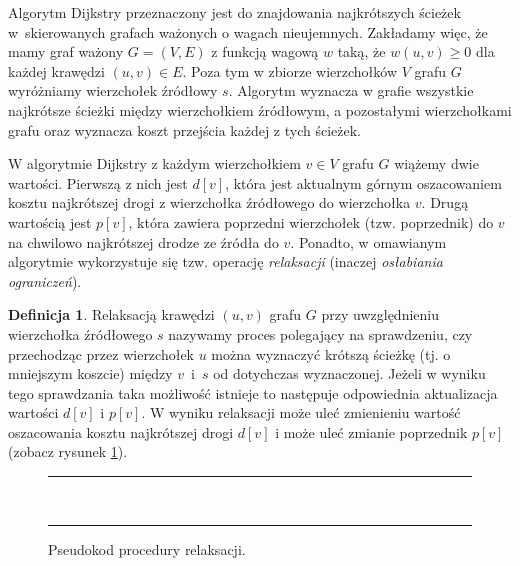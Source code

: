 \documentclass[12pt,a4paper]{book}
\newenvironment{myalgorithm}
{\rule{\textwidth}{0.5mm}\\\SetAlCapSty{}\SetAlgoNoEnd\SetAlgoNoLine\begin{algorithm}}{\end{algorithm}\rule{\textwidth}{0.5mm}}
\theoremstyle{definition}
\newtheorem{de}{Definicja}[chapter]
\numberwithin{equation}{chapter}
\begin{document}
Algorytm Dijkstry przeznaczony jest do znajdowania najkrótszych ścieżek w~skierowanych grafach ważonych o wagach nieujemnych. Zakładamy więc, że mamy graf ważony $G = (V, E)$ z funkcją wagową $w$ taką, że $w(u, v) \geq 0$ dla każdej krawędzi $(u,v)\in E$. Poza tym w zbiorze wierzchołków $V$ grafu $G$ wyróżniamy wierzchołek źródłowy $s$. Algorytm wyznacza w grafie wszystkie najkrótsze ścieżki między wierzchołkiem źródłowym, a pozostałymi wierzchołkami grafu oraz wyznacza koszt przejścia każdej z tych ścieżek.

W algorytmie Dijkstry z każdym wierzchołkiem $v\in V$ grafu $G$ wiążemy dwie wartości. Pierwszą z nich jest $d[v]$, która jest aktualnym górnym oszacowaniem kosztu najkrótszej drogi z wierzchołka źródłowego do wierzchołka $v$. Drugą wartością jest $p[v]$, która zawiera poprzedni wierzchołek (tzw. poprzednik) do $v$ na chwilowo najkrótszej drodze ze źródła do $v$. Ponadto, w omawianym algorytmie wykorzystuje się tzw. operację \textit{relaksacji} (inaczej \textit{osłabiania ograniczeń}).

\begin{de}
Relaksacją krawędzi $(u, v)$ grafu $G$ przy uwzględnieniu wierzchołka źródłowego $s$ nazywamy proces polegający na sprawdzeniu, czy przechodząc przez wierzchołek $u$ można wyznaczyć krótszą ścieżkę (tj. o mniejszym koszcie) między $v$~i~$s$ od dotychczas wyznaczonej. Jeżeli w wyniku tego sprawdzania taka możliwość istnieje to następuje odpowiednia aktualizacja wartości $d[v]$ i $p[v]$. W wyniku relaksacji może uleć zmienieniu wartość oszacowania kosztu najkrótszej drogi $d[v]$ i może uleć zmianie poprzednik $p[v]$ (zobacz rysunek \ref{RELAX_pseudokod}).

\begin{figure}[ht]
\begin{myalgorithm}[H]
	\DontPrintSemicolon
\end{myalgorithm}
\caption{Pseudokod procedury relaksacji.}
\label{RELAX_pseudokod}
\end{figure}
\end{de}
\end{document}
